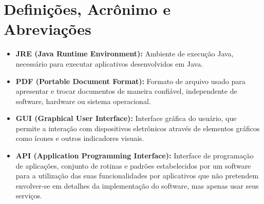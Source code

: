 \section{Definições, Acrônimo e Abreviações}

\begin{itemize}
    \item \textbf{JRE (Java Runtime Environment):} Ambiente de execução Java, necessário para executar aplicativos desenvolvidos em Java.
    \item \textbf{PDF (Portable Document Format):} Formato de arquivo usado para apresentar e trocar documentos de maneira confiável, independente de software, hardware ou sistema operacional.
    \item \textbf{GUI (Graphical User Interface):} Interface gráfica do usuário, que permite a interação com dispositivos eletrônicos através de elementos gráficos como ícones e outros indicadores visuais.
    \item \textbf{API (Application Programming Interface):} Interface de programação de aplicações, conjunto de rotinas e padrões estabelecidos por um software para a utilização das suas funcionalidades por aplicativos que não pretendem envolver-se em detalhes da implementação do software, mas apenas usar seus serviços.
\end{itemize}
